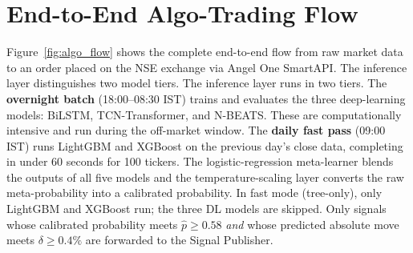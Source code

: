 \section{End-to-End Algo-Trading Flow}

Figure~\ref{fig:algo_flow} shows the complete end-to-end flow from raw market data to an order placed on the NSE exchange via Angel One SmartAPI. The inference layer distinguishes two model tiers. The inference layer runs in two tiers. The \textbf{overnight batch} (18:00--08:30 IST) trains and evaluates the three deep-learning models: BiLSTM, TCN-Transformer, and N-BEATS. These are computationally intensive and run during the off-market window. The \textbf{daily fast pass} (09:00 IST) runs LightGBM and XGBoost on the previous day's close data, completing in under 60 seconds for 100 tickers. The logistic-regression meta-learner blends the outputs of all five models and the temperature-scaling layer converts the raw meta-probability into a calibrated probability. In fast mode (tree-only), only LightGBM and XGBoost run; the three DL models are skipped. Only signals whose calibrated probability meets $\hat{p} \geq 0.58$ \emph{and} whose predicted absolute move meets $\delta \geq 0.4\%$ are forwarded to the Signal Publisher.

